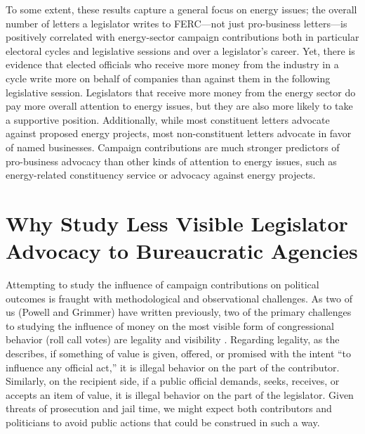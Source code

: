 \documentclass{article}
\begin{document}
To some extent, these results capture a general focus on energy issues; the overall number of letters a legislator writes to FERC---not just pro-business letters---is positively correlated with energy-sector campaign contributions both in particular electoral cycles and legislative sessions and over a legislator's career. Yet, there is evidence that elected officials who receive more money from the industry in a cycle write more on behalf of companies than against them in the following legislative session. Legislators that receive more money from the energy sector do pay more overall attention to energy issues, but they are also more likely to take a supportive position.
Additionally, while most constituent letters advocate against proposed energy projects, most non-constituent letters advocate in favor of named businesses. Campaign contributions are much stronger predictors of pro-business advocacy than other kinds of attention to energy issues, such as energy-related constituency service or advocacy against energy projects. 

\section{Why Study Less Visible Legislator Advocacy to Bureaucratic Agencies}

Attempting to study the influence of campaign contributions on political outcomes is fraught with methodological and observational challenges.  As two of us (Powell and Grimmer) have written previously, two of the primary challenges to studying the influence of money on the most visible form of congressional behavior (roll call votes) are legality and visibility \citep{PowellGrimmer2016}. Regarding legality, as the \citet{USOGE2013} describes, if something of value is given, offered, or promised with the intent ``to influence any official act,'' it is illegal behavior on the part of the contributor. Similarly, on the recipient side, if a public official demands, seeks, receives, or accepts an item of value, it is illegal behavior on the part of the legislator.  Given threats of prosecution and jail time, we might expect both contributors and politicians to avoid public actions that could be construed in such a way.  
\end{document}
